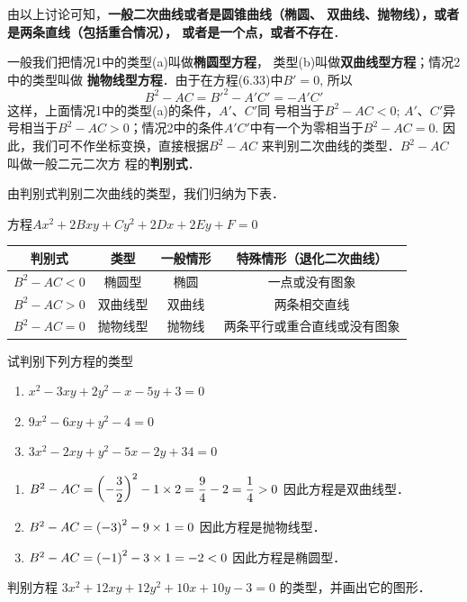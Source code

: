 由以上讨论可知，\textbf{一般二次曲线或者是圆锥曲线（椭圆、
双曲线、抛物线），或者是两条直线（包括重合情况），
或者是一个点，或者不存在}．

一般我们把情况1中的类型(a)叫做\textbf{椭圆型方程}，
类型(b)叫做\textbf{双曲线型方程}；情况2中的类型叫做
\textbf{抛物线型方程}．由于在方程(6.33)中$B'=0$, 所以
\[B^2-AC={B'}^2-A'C'=-A'C'\]
这样，上面情况1中的类型(a)的条件，$A'$、$C'$同
号相当于$B^2-AC<0$; $A'$、$C'$异号相当于$B^2-AC
>0$；情况2中的条件$A'C'$中有一个为零相当于$B^2-
AC=0$. 因此，我们可不作坐标变换，直接根据$B^2-AC$
来判别二次曲线的类型．$B^2-AC$叫做一般二元二次方
程的\textbf{判别式}．

由判别式判别二次曲线的类型，我们归纳为下表．
\begin{center}
    方程$Ax^2+2Bxy+Cy^2+2Dx+2Ey+F=0$
\begin{tabular}{cccc}
\hline
判别式&类型&一般情形&特殊情形（退化二次曲线）\\
\hline
$B^2-AC<0$ &椭圆型&椭圆&一点或没有图象\\
$B^2-AC>0$ &双曲线型&双曲线&两条相交直线\\
$B^2-AC=0$&抛物线型&抛物线&两条平行或重合直线或没有图象\\
\hline
\end{tabular}
\end{center}



\begin{example}
    试判别下列方程的类型
\begin{enumerate}
    \item $x^2-3xy+2y^2-x-5y+3=0$
    \item $9x^2-6xy+y^2-4=0$
    \item $3x^2-2xy+y^2-5x-2y+34=0$
\end{enumerate}
\end{example}

\begin{solution}
\begin{enumerate}
    \item $B^2-AC=\left(-\dfrac{3}{2}\right)^2-1\times 2=\dfrac{9}{4}-2=\dfrac{1}{4}>0$
因此方程是双曲线型．
\item $B^2-AC=\left(-3\right)^2-9\times 1=0$
因此方程是抛物线型．
\item $B^2-AC=\left(-1\right)^2-3\times 1=-2<0$
因此方程是椭圆型．
\end{enumerate}    
\end{solution}

\begin{example}
    判别方程
$3x^2+12xy+12y^2+10x+10y-3=0$
的类型，并画出它的图形．
\end{example}

